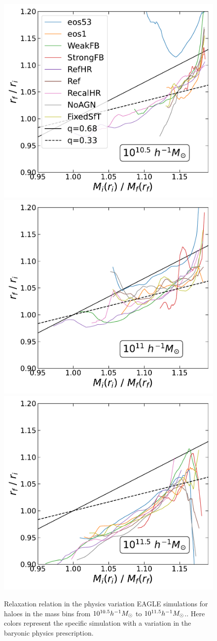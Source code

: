 \begin{figure}[htbp]
\centering
\includegraphics[width=0.32\linewidth]{plots/eagle_physvar_rad_indep_relxn_reln_MiMf_10.5.pdf}
\includegraphics[width=0.32\linewidth]{plots/eagle_physvar_rad_indep_relxn_reln_MiMf_11.pdf}
\includegraphics[width=0.32\linewidth]{plots/eagle_physvar_rad_indep_relxn_reln_MiMf_11.5.pdf}
\caption[]{Relaxation relation in the physics variation EAGLE simulations for haloes in the mass bins from $10^{10.5} h^{-1}M_{\odot}$ to $10^{11.5} h^{-1}M_{\odot}$.. Here colors represent the specific simulation with a variation in the baryonic physics prescription. } 
\label{fig:EAGLE-rad-indep}
\end{figure}

